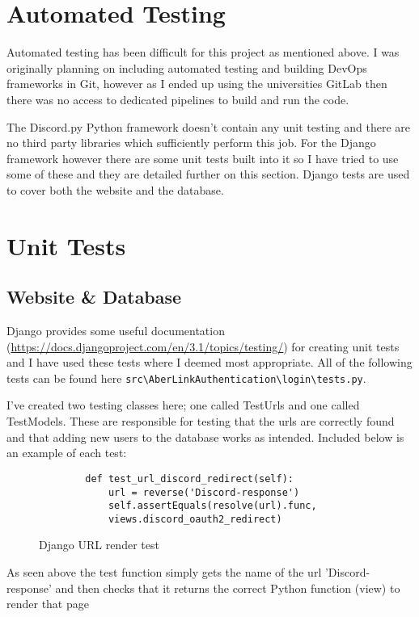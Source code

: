 \section{Automated Testing}
Automated testing has been difficult for this project as mentioned above. I was originally planning on including automated testing and building DevOps frameworks in Git, however as I ended up using the universities GitLab then there was no access to dedicated pipelines to build and run the code.  

The Discord.py Python framework doesn't contain any unit testing and there are no third party libraries which sufficiently perform this job. For the Django framework however there are some unit tests built into it so I have tried to use some of these and they are detailed further on this section. Django tests are used to cover both the website and the database. 

\section{Unit Tests}

\subsection{Website \& Database}
Django provides some useful documentation (\href{https://docs.djangoproject.com/en/3.1/topics/testing/}{https://docs.djangoproject.com/en/3.1/topics/testing/}) for creating unit tests and I have used these tests where I deemed most appropriate. All of the following tests can be found here \verb|src\AberLinkAuthentication\login\tests.py|. 

I've created two testing classes here; one called TestUrls and one called TestModels. These are responsible for testing that the urls are correctly found and that adding new users to the database works as intended. Included below is an example of each test:

\begin{figure}[H]
    \begin{verbatim}
        def test_url_discord_redirect(self):
            url = reverse('Discord-response')
            self.assertEquals(resolve(url).func, 
            views.discord_oauth2_redirect)
    \end{verbatim}
    \caption{Django URL render test}
    \label{fig:django-url}
\end{figure}
As seen above the test function simply gets the name of the url 'Discord-response' and then checks that it returns the correct Python function (view) to render that page

